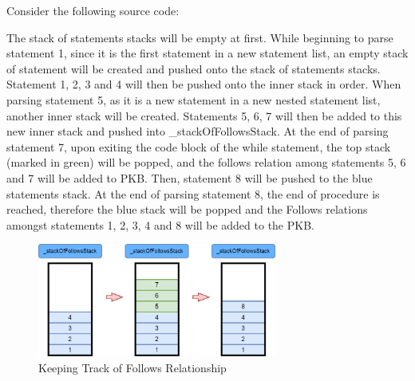 \documentclass[12pt]{article}
\begin{document}
Consider the following source code:
\begin{center}
\end{center}
\vspace{10mm}
The stack of statements stacks will be empty at first. While beginning to parse statement 1, since it is the first statement in a new statement list, an empty stack of statement will be created and pushed onto the stack of statements stacks. Statement 1, 2, 3 and 4 will then be pushed onto the inner stack in order. When parsing statement 5, as it is a new statement in a new nested statement list, another inner stack will be created. Statements 5, 6, 7 will then be added to this new inner stack and pushed into \_stackOfFollowsStack. At the end of parsing statement 7, upon exiting the code block of the while statement, the top stack (marked in green) will be popped, and the follows relation among statements 5, 6 and 7 will be added to PKB. Then, statement 8 will be pushed to the blue statements stack. At the end of parsing statement 8, the end of procedure is reached, therefore the blue stack will be popped and the Follows relations amongst statements 1, 2, 3, 4 and 8 will be added to the PKB.
\begin{figure}[H]
  \caption{Keeping Track of Follows Relationship}
  \centering
    \includegraphics[width=0.7\textwidth]{Parser_AddingFollowsRelationToPKB.png}
\end{figure}
\end{document}
